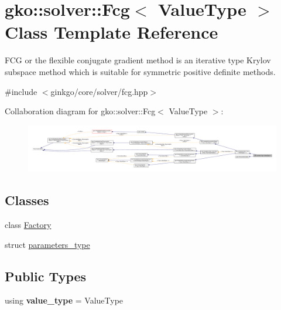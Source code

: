 \hypertarget{classgko_1_1solver_1_1Fcg}{}\section{gko\+:\+:solver\+:\+:Fcg$<$ Value\+Type $>$ Class Template Reference}
\label{classgko_1_1solver_1_1Fcg}


F\+CG or the flexible conjugate gradient method is an iterative type Krylov subspace method which is suitable for symmetric positive definite methods.  




{\ttfamily \#include $<$ginkgo/core/solver/fcg.\+hpp$>$}



Collaboration diagram for gko\+:\+:solver\+:\+:Fcg$<$ Value\+Type $>$\+:
\nopagebreak
\begin{figure}[H]
\begin{center}
\leavevmode
\includegraphics[width=350pt]{classgko_1_1solver_1_1Fcg__coll__graph}
\end{center}
\end{figure}
\subsection*{Classes}
\begin{DoxyCompactItemize}
\item 
class \hyperlink{classgko_1_1solver_1_1Fcg_1_1Factory}{Factory}
\item 
struct \hyperlink{structgko_1_1solver_1_1Fcg_1_1parameters__type}{parameters\+\_\+type}
\end{DoxyCompactItemize}
\subsection*{Public Types}
\begin{DoxyCompactItemize}
\item 
\mbox{\label{classgko_1_1solver_1_1Fcg_aacc2d9bd24b654a16f9eb6719d5de1bb}} 
using {\bfseries value\+\_\+type} = Value\+Type
\end{DoxyCompactItemize}
